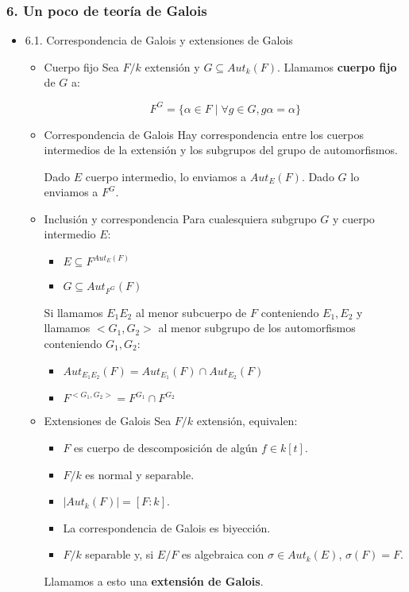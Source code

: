 \documentclass[11pt]{article}
\begin{document}
\subsubsection*{6. Un poco de teoría de Galois}
\label{sec-4-3-2}
\begin{itemize}
\item 6.1. Correspondencia de Galois y extensiones de Galois
\label{sec-4-3-2-1}
\begin{itemize}
\item Cuerpo fijo
\label{sec-4-3-2-1-1}
Sea $F/k$ extensión y $G \subseteq Aut_k(F)$. Llamamos \textbf{cuerpo fijo} de $G$ a:

\[ F^G = \{ \alpha\in F \mid \forall g \in G, g\alpha=\alpha\}\]

\item Correspondencia de Galois
\label{sec-4-3-2-1-2}
Hay correspondencia entre los cuerpos intermedios de la extensión
y los subgrupos del grupo de automorfismos.

Dado $E$ cuerpo intermedio, lo enviamos a $Aut_E(F)$. Dado $G$ lo enviamos
a $F^G$.

\item Inclusión y correspondencia
\label{sec-4-3-2-1-3}
Para cualesquiera subgrupo $G$ y cuerpo intermedio $E$:

\begin{itemize}
\item $E \subseteq F^{Aut_E(F)}$
\item $G \subseteq Aut_{F^G}(F)$
\end{itemize}

Si llamamos $E_1E_2$ al menor subcuerpo de $F$ conteniendo $E_1,E_2$ y llamamos
$<G_1,G_2>$ al menor subgrupo de los automorfismos conteniendo $G_1,G_2$:

\begin{itemize}
\item $Aut_{E_1E_2}(F) = Aut_{E_1}(F) \cap Aut_{E_2}(F)$
\item $F^{<G_1,G_2>} = F^{G_1} \cap F^{G_2}$
\end{itemize}

\item Extensiones de Galois
\label{sec-4-3-2-1-4}
Sea $F/k$ extensión, equivalen:

\begin{itemize}
\item $F$ es cuerpo de descomposición de algún $f \in k[t]$.
\item $F/k$ es normal y separable.
\item $|Aut_k(F)| = [F : k]$.
\item La correspondencia de Galois es biyección.
\item $F/k$ separable y, si $E/F$ es algebraica con $\sigma \in Aut_k(E)$, $\sigma(F)=F$.
\end{itemize}

Llamamos a esto una \textbf{extensión de Galois}.
\end{itemize}
\end{itemize}
\end{document}
